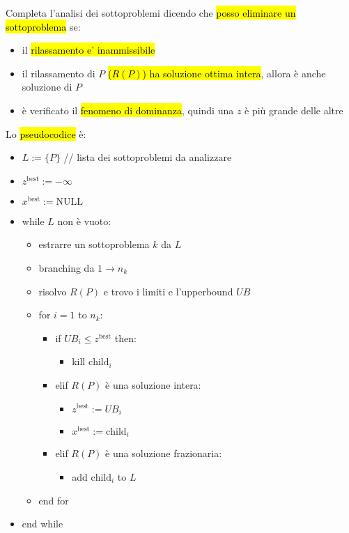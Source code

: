 Completa l'analisi dei sottoproblemi dicendo che \hl{posso eliminare un sottoproblema} se:

\begin{itemize}
    \item il \hl{rilassamento e' inammissibile}
    \item il rilassamento di $P$ \hl{($R(P)$) ha soluzione ottima intera}, allora è anche soluzione di $P$
    \item è verificato il \hl{fenomeno di dominanza}, quindi una $z$ è più grande delle altre
\end{itemize}

Lo \hl{pseudocodice} è:

\begin{itemize}
    \item[] $L := \{P\}$ // lista dei sottoproblemi da analizzare
    \item[] $z^{\text{best}} := -\infty$
    \item[] $x^{\text{best}} := \text{NULL}$
    \item[] while $L$ non è vuoto:
    \begin{itemize}
        \item[] estrarre un sottoproblema $k$ da $L$
        \item[] branching da $1 \to n_k$
        \item[] risolvo $R(P)$ e trovo i limiti e l'upperbound $UB$
        \item[] for $i = 1$ to $n_k$:
        \begin{itemize}
            \item[] if $UB_i \leq z^{\text{best}}$ then:
            \begin{itemize}
                \item[] kill $\text{child}_i$
            \end{itemize}
            \item[] elif $R(P)$ è una soluzione intera:
            \begin{itemize}
                \item[] $z^{\text{best}} := UB_i$
                \item[] $x^{\text{best}} := \text{child}_i$
            \end{itemize}
            \item[] elif $R(P)$ è una soluzione frazionaria:
            \begin{itemize}
                \item[] add $\text{child}_i$ to $L$
            \end{itemize}
        \end{itemize}
        \item[] end for
    \end{itemize}
    \item[] end while
\end{itemize}


